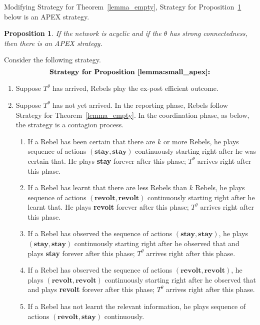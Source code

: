 \documentclass[12pt,letter]{article}
\newtheorem{lemma}{Lemma}[section]
\newtheorem{proposition}{Proposition}[section]
\theoremstyle{definition}
\theoremstyle{remark}
\theoremstyle{claim}
\begin{document}



Modifying Strategy for Theorem~\ref{lemma_empty}, Strategy for Proposition~\ref{lemma:small_apex} below is an APEX strategy.
\begin{proposition}
\label{lemma:small_apex}
If the network is acyclic and if the $\theta$ has strong connectedness, then there is an APEX strategy.
\end{proposition}
Consider the following strategy. 
\[\textbf{Strategy for Proposition~\ref{lemma:small_apex}:}\]
\begin{enumerate}
\item Suppose $T^{\theta}$ has arrived, Rebels play the ex-post efficient outcome. 
\item Suppose $T^{\theta}$ has not yet arrived. In the reporting phase, Rebels follow Strategy for Theorem~\ref{lemma_empty}. In the coordination phase, as below, the strategy is a contagion process. 
\begin{enumerate}
\item If a Rebel has been certain that there are $k$ or more Rebels, he plays sequence of actions $(\textbf{stay},\textbf{stay})$ continuously starting right after he was certain that. He plays \textbf{stay} forever after this phase; $T^{\theta}$ arrives right after this phase.
\item If a Rebel has learnt that there are less Rebels than $k$ Rebels, he plays sequence of actions $(\textbf{revolt},\textbf{revolt})$ continuously starting right after he learnt that. He plays \textbf{revolt} forever after this phase; $T^{\theta}$ arrives right after this phase.
\item If a Rebel has observed the sequence of actions $(\textbf{stay},\textbf{stay})$, he plays $(\textbf{stay},\textbf{stay})$ continuously starting right after he observed that and plays \textbf{stay} forever after this phase; $T^{\theta}$ arrives right after this phase.
\item If a Rebel has observed the sequence of actions $(\textbf{revolt},\textbf{revolt})$, he plays $(\textbf{revolt},\textbf{revolt})$ continuously starting right after he observed that and plays \textbf{revolt} forever after this phase; $T^{\theta}$ arrives right after this phase.
\item If a Rebel has not learnt the relevant information, he plays sequence of actions $(\textbf{revolt},\textbf{stay})$ continuously.
\end{enumerate} 
\end{enumerate}
\end{document}
